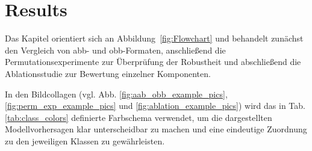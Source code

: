 \chapter{Results}
\label{ch:results}
Das Kapitel orientiert sich an Abbildung~\ref{fig:Flowchart} und behandelt zunächst den Vergleich von \acrshort{abb}- und \acrshort{obb}-Formaten, anschließend die Permutationsexperimente zur Überprüfung der Robustheit und abschließend die Ablationsstudie zur Bewertung einzelner Komponenten. 

In den Bildcollagen (vgl. Abb. \ref{fig:aab_obb_example_pics}, \ref{fig:perm_exp_example_pics} und \ref{fig:ablation_example_pics}) wird das in Tab. \ref{tab:class_colors} definierte Farbschema verwendet, um die dargestellten Modellvorhersagen klar unterscheidbar zu machen und eine eindeutige Zuordnung zu den jeweiligen Klassen zu gewährleisten.




